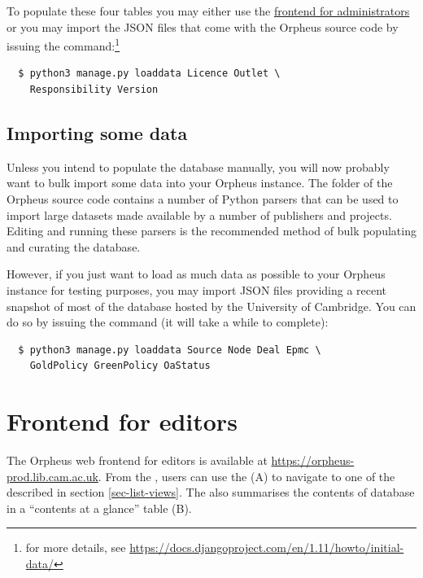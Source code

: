\documentclass[british, 12pt]{article}
\begin{document}
To populate these four tables you may either use the \hyperref[sec-frontend-for-administrators]{frontend for administrators} or you may import the JSON files that come with the Orpheus source code by issuing the command:\footnote{for more details, see \url{https://docs.djangoproject.com/en/1.11/howto/initial-data/}}

\begin{lstlisting}
  $ python3 manage.py loaddata Licence Outlet \
    Responsibility Version
\end{lstlisting}

\subsection{Importing some data}

Unless you intend to populate the database manually, you will now probably want to bulk import some data into your Orpheus instance. The  folder of the Orpheus source code contains a number of Python parsers that can be used to import large datasets made available by a number of publishers and projects. Editing and running these parsers is the recommended method of bulk populating and curating the database. 

However, if you just want to load as much data as possible to your Orpheus instance for testing purposes, you may import JSON files providing a recent snapshot of most of the database hosted by the University of Cambridge. You can do so by issuing the command (it will take a while to complete):

\begin{lstlisting}
  $ python3 manage.py loaddata Source Node Deal Epmc \
    GoldPolicy GreenPolicy OaStatus
\end{lstlisting}

\section{Frontend for editors}
\label{sec-frontend-for-editors}

The Orpheus web frontend for editors is available at \url{https://orpheus-prod.lib.cam.ac.uk}. From the , users can use the  (\figp{\ref{fig-home}}A) to navigate to one of the  described in section \vref{sec-list-views}. The  also summarises the contents of database in a ``contents at a glance'' table (\figp{\ref{fig-home}}B).
\end{document}
